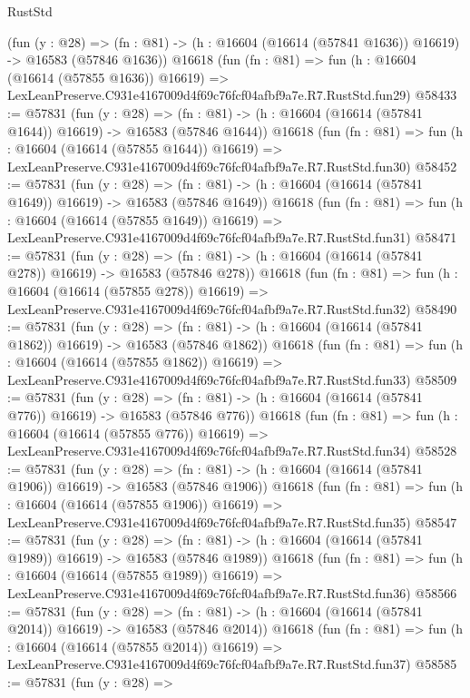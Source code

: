 \begin{lexlean}{RustStd}
\begin{coremodule}
    (fun (y : @28) =>
    (fn : @81) -> (h : @16604 (@16614 (@57841 @1636)) @16619) -> @16583 (@57846 @1636))
    @16618
    (fun (fn : @81) =>
    fun (h : @16604 (@16614 (@57855 @1636)) @16619) =>
    LexLeanPreserve.C931e4167009d4f69c76fcf04afbf9a7e.R7.RustStd.fun29)
@58433 := @57831
    (fun (y : @28) =>
    (fn : @81) -> (h : @16604 (@16614 (@57841 @1644)) @16619) -> @16583 (@57846 @1644))
    @16618
    (fun (fn : @81) =>
    fun (h : @16604 (@16614 (@57855 @1644)) @16619) =>
    LexLeanPreserve.C931e4167009d4f69c76fcf04afbf9a7e.R7.RustStd.fun30)
@58452 := @57831
    (fun (y : @28) =>
    (fn : @81) -> (h : @16604 (@16614 (@57841 @1649)) @16619) -> @16583 (@57846 @1649))
    @16618
    (fun (fn : @81) =>
    fun (h : @16604 (@16614 (@57855 @1649)) @16619) =>
    LexLeanPreserve.C931e4167009d4f69c76fcf04afbf9a7e.R7.RustStd.fun31)
@58471 := @57831
    (fun (y : @28) =>
    (fn : @81) -> (h : @16604 (@16614 (@57841 @278)) @16619) -> @16583 (@57846 @278))
    @16618
    (fun (fn : @81) =>
    fun (h : @16604 (@16614 (@57855 @278)) @16619) =>
    LexLeanPreserve.C931e4167009d4f69c76fcf04afbf9a7e.R7.RustStd.fun32)
@58490 := @57831
    (fun (y : @28) =>
    (fn : @81) -> (h : @16604 (@16614 (@57841 @1862)) @16619) -> @16583 (@57846 @1862))
    @16618
    (fun (fn : @81) =>
    fun (h : @16604 (@16614 (@57855 @1862)) @16619) =>
    LexLeanPreserve.C931e4167009d4f69c76fcf04afbf9a7e.R7.RustStd.fun33)
@58509 := @57831
    (fun (y : @28) =>
    (fn : @81) -> (h : @16604 (@16614 (@57841 @776)) @16619) -> @16583 (@57846 @776))
    @16618
    (fun (fn : @81) =>
    fun (h : @16604 (@16614 (@57855 @776)) @16619) =>
    LexLeanPreserve.C931e4167009d4f69c76fcf04afbf9a7e.R7.RustStd.fun34)
@58528 := @57831
    (fun (y : @28) =>
    (fn : @81) -> (h : @16604 (@16614 (@57841 @1906)) @16619) -> @16583 (@57846 @1906))
    @16618
    (fun (fn : @81) =>
    fun (h : @16604 (@16614 (@57855 @1906)) @16619) =>
    LexLeanPreserve.C931e4167009d4f69c76fcf04afbf9a7e.R7.RustStd.fun35)
@58547 := @57831
    (fun (y : @28) =>
    (fn : @81) -> (h : @16604 (@16614 (@57841 @1989)) @16619) -> @16583 (@57846 @1989))
    @16618
    (fun (fn : @81) =>
    fun (h : @16604 (@16614 (@57855 @1989)) @16619) =>
    LexLeanPreserve.C931e4167009d4f69c76fcf04afbf9a7e.R7.RustStd.fun36)
@58566 := @57831
    (fun (y : @28) =>
    (fn : @81) -> (h : @16604 (@16614 (@57841 @2014)) @16619) -> @16583 (@57846 @2014))
    @16618
    (fun (fn : @81) =>
    fun (h : @16604 (@16614 (@57855 @2014)) @16619) =>
    LexLeanPreserve.C931e4167009d4f69c76fcf04afbf9a7e.R7.RustStd.fun37)
@58585 := @57831
    (fun (y : @28) =>

\end{coremodule}
\end{lexlean}
